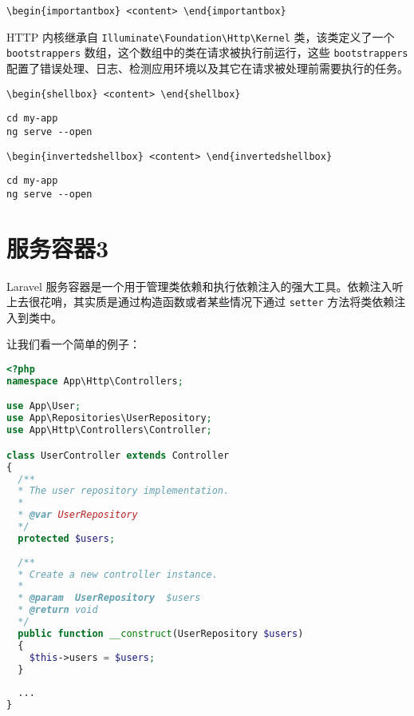 \documentclass{progartcn}
\begin{document}
\noindent\verb|\begin{importantbox} <content> \end{importantbox}|

\begin{importantbox}
  HTTP 内核继承自 \verb|Illuminate\Foundation\Http\Kernel| 类，该类定义了一个 \verb|bootstrappers| 数组，这个数组中的类在请求被执行前运行，这些 \verb|bootstrappers| 配置了错误处理、日志、检测应用环境以及其它在请求被处理前需要执行的任务。
\end{importantbox}

\noindent\verb|\begin{shellbox} <content> \end{shellbox}|

\begin{shellbox}
\begin{verbatim}
cd my-app
ng serve --open
\end{verbatim}
\end{shellbox}

\noindent\verb|\begin{invertedshellbox} <content> \end{invertedshellbox}|

\begin{invertedshellbox}
\begin{verbatim}
cd my-app
ng serve --open
\end{verbatim}
\end{invertedshellbox}


\section{服务容器3}

Laravel 服务容器是一个用于管理类依赖和执行依赖注入的强大工具。依赖注入听上去很花哨，其实质是通过构造函数或者某些情况下通过 \verb|setter| 方法将类依赖注入到类中。

让我们看一个简单的例子：

\clearpage

\begin{lstlisting}[language=PHP,caption={PHP 代码样例}]
<?php
namespace App\Http\Controllers;

use App\User;
use App\Repositories\UserRepository;
use App\Http\Controllers\Controller;

class UserController extends Controller
{
  /**
  * The user repository implementation.
  *
  * @var UserRepository
  */
  protected $users;
  
  /**
  * Create a new controller instance.
  * 
  * @param  UserRepository  $users
  * @return void
  */
  public function __construct(UserRepository $users)
  {
    $this->users = $users;
  }
  
  ...
}
\end{lstlisting}
\end{document}
